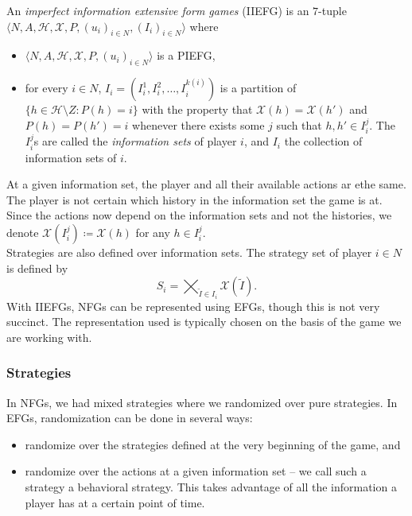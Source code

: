 	\begin{fdef}
		An \emph{imperfect information extensive form games} (IIEFG) is an $7$-tuple $\langle N,A,\mathcal{H},\mathcal{X},P,(u_i)_{i\in N},(I_i)_{i \in N}\rangle$ where
		\begin{itemize}
			\item $\langle N,A,\mathcal{H},\mathcal{X},P,(u_i)_{i\in N}\rangle$ is a PIEFG,
			\item for every $i \in N$, $I_i = (I_i^1,I_i^2,\ldots,I_i^{k(i)})$ is a partition of $\{ h \in \mathcal{H} \setminus Z : P(h) = i \}$ with the property that $\mathcal{X}(h) = \mathcal{X}(h')$ and $P(h) = P(h') = i$ whenever there exists some $j$ such that $h,h' \in I_i^j$. The $I_i^j$s are called the \emph{information sets} of player $i$, and $I_i$ the collection of information sets of $i$.
		\end{itemize}
	\end{fdef}

	At a given information set, the player and all their available actions ar ethe same. The player is not certain which history in the information set the game is at.\\
	Since the actions now depend on the information sets and not the histories, we denote $\mathcal{X}(I_i^j) \coloneqq \mathcal{X}(h)$ for any $h \in I_i^j$.\\
	Strategies are also defined over information sets. The strategy set of player $i \in N$ is defined by
	\[ S_i = \bigtimes_{\tilde{I} \in I_i} \mathcal{X}(\tilde{I}). \]
	With IIEFGs, NFGs can be represented using EFGs, though this is not very succinct. The representation used is typically chosen on the basis of the game we are working with.

	\subsubsection{Strategies}

		In NFGs, we had mixed strategies where we randomized over pure strategies. In EFGs, randomization can be done in several ways:
		\begin{itemize}
			\item randomize over the strategies defined at the very beginning of the game, and
			\item randomize over the actions at a given information set -- we call such a strategy a behavioral strategy. This takes advantage of all the information a player has at a certain point of time.
		\end{itemize}

